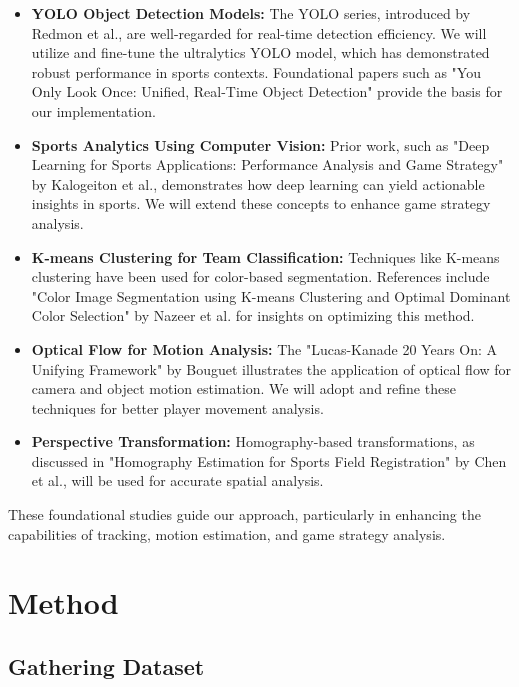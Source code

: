 \begin{itemize}
    \item \textbf{YOLO Object Detection Models:} The YOLO series, introduced by Redmon et al., are well-regarded for real-time detection efficiency. We will utilize and fine-tune the ultralytics YOLO model, which has demonstrated robust performance in sports contexts. Foundational papers such as "You Only Look Once: Unified, Real-Time Object Detection" provide the basis for our implementation.

    \item \textbf{Sports Analytics Using Computer Vision:} Prior work, such as "Deep Learning for Sports Applications: Performance Analysis and Game Strategy" by Kalogeiton et al., demonstrates how deep learning can yield actionable insights in sports. We will extend these concepts to enhance game strategy analysis.

    \item \textbf{K-means Clustering for Team Classification:} Techniques like K-means clustering have been used for color-based segmentation. References include "Color Image Segmentation using K-means Clustering and Optimal Dominant Color Selection" by Nazeer et al. for insights on optimizing this method.

    \item \textbf{Optical Flow for Motion Analysis:} The "Lucas-Kanade 20 Years On: A Unifying Framework" by Bouguet illustrates the application of optical flow for camera and object motion estimation. We will adopt and refine these techniques for better player movement analysis.

    \item \textbf{Perspective Transformation:} Homography-based transformations, as discussed in "Homography Estimation for Sports Field Registration" by Chen et al., will be used for accurate spatial analysis.
\end{itemize}

These foundational studies guide our approach, particularly in enhancing the capabilities of tracking, motion estimation, and game strategy analysis.


\section{Method}
\subsection{Gathering Dataset}

